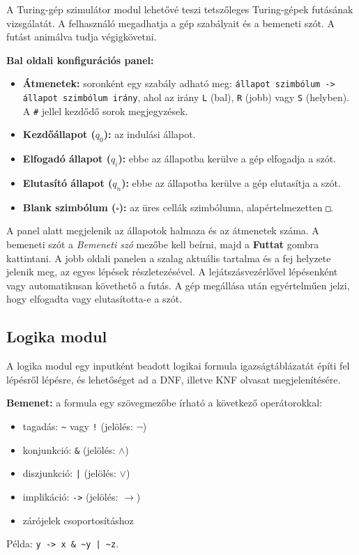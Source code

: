 \begin{itemize}
A Turing-gép szimulátor modul lehetővé teszi tetszőleges Turing-gépek futásának vizsgálatát. 
A felhasználó megadhatja a gép szabályait és a bemeneti szót.
A futást animálva tudja végigkövetni.

\textbf{Bal oldali konfigurációs panel:}
\begin{itemize}
  \item \textbf{Átmenetek:} soronként egy szabály adható meg: \texttt{állapot szimbólum -> állapot szimbólum irány}, ahol az irány \texttt{L} (bal), \texttt{R} (jobb) vagy \texttt{S} (helyben). A \texttt{\#} jellel kezdődő sorok megjegyzések.
  \item \textbf{Kezdőállapot ($q_0$):} az indulási állapot.
  \item \textbf{Elfogadó állapot ($q_i$):} ebbe az állapotba kerülve a gép elfogadja a szót.
  \item \textbf{Elutasító állapot ($q_n$):} ebbe az állapotba kerülve a gép elutasítja a szót.
  \item \textbf{Blank szimbólum ($\square$):} az üres cellák szimbóluma, alapértelmezetten \texttt{□}.
\end{itemize}

A panel alatt megjelenik az állapotok halmaza és az átmenetek száma. 
A bemeneti szót a \emph{Bemeneti szó} mezőbe kell beírni, 
majd a \textbf{Futtat} gombra kattintani. 
A jobb oldali panelen a szalag aktuális tartalma 
és a fej helyzete jelenik meg, az egyes lépések részletezésével. 
A lejátszásvezérlővel lépésenként vagy automatikusan követhető a futás. 
A gép megállása után egyértelműen jelzi, hogy elfogadta vagy elutasította-e a szót.

\subsection{Logika modul}

A logika modul egy inputként beadott logikai formula igazságtáblázatát építi fel lépésről lépésre, és lehetőséget ad a DNF, illetve KNF olvasat megjelenítésére.

\textbf{Bemenet:} a formula egy szövegmezőbe írható a következő operátorokkal:
\begin{itemize}
  \item tagadás: \texttt{\textasciitilde} vagy \texttt{!} (jelölés: $\lnot$)
  \item konjunkció: \texttt{\&} (jelölés: $\land$)
  \item diszjunkció: \texttt{|} (jelölés: $\lor$)
  \item implikáció: \texttt{->} (jelölés: $\to$)
  \item zárójelek csoportosításhoz
\end{itemize}
Példa: \texttt{y -> x \& \textasciitilde{}y | \textasciitilde{}z}.


\end{itemize}

